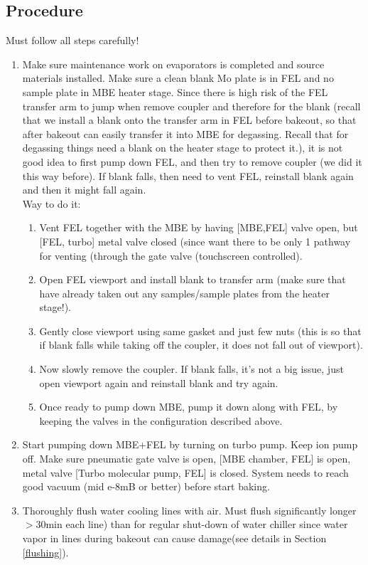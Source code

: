 \subsection{Procedure}
Must follow all steps carefully!
\begin{enumerate}
\item Make sure maintenance work on evaporators is completed and source materials installed. Make sure a clean blank Mo plate is in FEL and no sample plate in MBE heater stage. Since there is high risk of the FEL transfer arm to jump when remove coupler and therefore for the blank (recall that we install a blank onto the transfer arm in FEL before bakeout, so that after bakeout can easily transfer it into MBE for degassing. Recall that for degassing things need a blank on the heater stage to protect it.), it is not good idea to first pump down FEL, and then try to remove coupler (we did it this way before). If blank falls, then need to vent FEL, reinstall blank again and then it might fall again.\\
Way to do it:
\begin{enumerate}
	\item	Vent FEL together with the MBE by having [MBE,FEL] valve open, but [FEL, turbo] metal valve closed (since want there to be only 1 pathway for venting (through the gate valve (touchscreen controlled).  
	\item	Open FEL viewport and install blank to transfer arm (make sure that have already taken out any samples/sample plates from the heater stage!). 
	\item	Gently close viewport using same gasket and just few nuts (this is so that if blank falls while taking off the coupler, it does not fall out of viewport). 
	\item	Now slowly remove the coupler. If blank falls, it’s not a big issue, just open viewport again and reinstall blank and try again.
	\item	Once ready to pump down MBE, pump it down along with FEL, by keeping the valves in the configuration described above.
\end{enumerate}
\item	Start pumping down MBE+FEL by turning on turbo pump. Keep ion pump off. Make sure pneumatic gate valve is open, [MBE chamber, FEL] is open, metal valve [Turbo molecular pump, FEL] is closed. System needs to reach good vacuum (mid e-8mB or better) before start baking. 
\item	Thoroughly flush water cooling lines with air. Must flush significantly longer $>30$min each line) than for regular shut-down of water chiller since water vapor in lines during bakeout can cause damage(see details in Section \ref{flushing}).

\end{enumerate}
